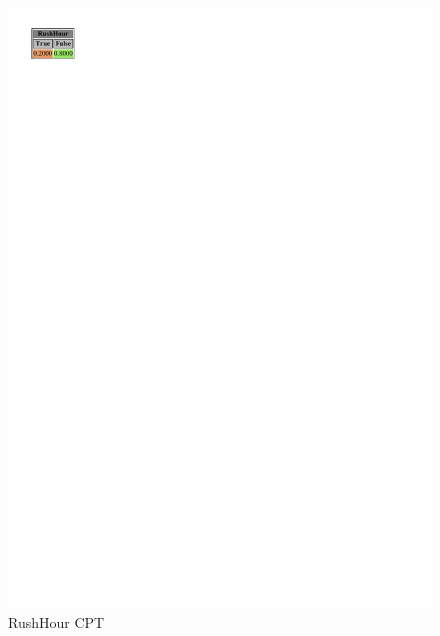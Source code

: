 \documentclass[a4paper,12pt]{article} %
\begin{document}
\begin{figure}[htb]
\begin{minipage}[c]{.3\textwidth}
		\includegraphics[width=\linewidth]{../code/rushhour.pdf}	
		\caption{RushHour CPT}
		\label{fig:rushhour}
	\end{minipage}
\end{figure}
\end{document}
